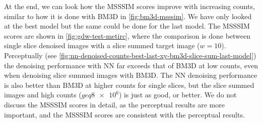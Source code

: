 At the end, we can look how the \gls{MSSSIM} scores improve with increasing counts, similar to how it is done with BM3D in \cref{fig:bm3d-msssim}. We have only looked at the best model but the same could be done for the last model. The \gls{MSSSIM} scores are shown in \cref{fig:gdw-test-metirc}, where the comparison is done between single slice denoised images with a slice summed target image ($w=10$). Perceptually (see \cref{fig:nn-denoised-counts-best-last-xy-bm3d-slice-sum-last-model}) the denoising performance with \gls{NN} far exceeds that of BM3D at low counts, even when denoising slice summed images with BM3D. The \gls{NN} denoising performance is also better than BM3D at higher counts for single slices, but the slice summed images and high counts ($geq \num{8e6}$) is just as good, or better. We do not discuss the \gls{MSSSIM} scores in detail, as the perceptual results are more important, and the \gls{MSSSIM} scores are consistent with the perceptual results.








